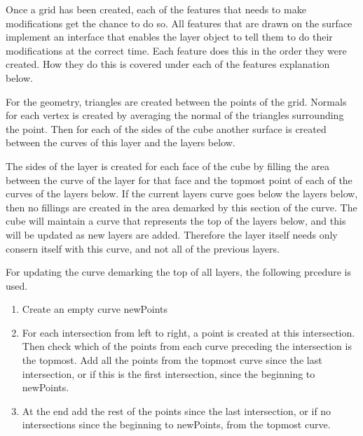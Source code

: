 \documentclass[a4paper,12pt]{article}
\begin{document}
Once a grid has been created, each of the features that needs to make modifications get the chance to do so. All features that are drawn on the surface implement an interface that enables the layer object to tell them to do their modifications at the correct time. Each feature does this in the order they were created. How they do this is covered under each of the features explanation below.

For the geometry, triangles are created between the points of the grid. Normals for each vertex is created by averaging the normal of the triangles surrounding the point. Then for each of the sides of the cube another surface is created between the curves of this layer and the layers below.

The sides of the layer is created for each face of the cube by filling the area between the curve of the layer for that face and the topmost point of each of the curves of the layers below. If the current layers curve goes below the layers below, then no fillings are created in the area demarked by this section of the curve. The cube will maintain a curve that represents the top of the layers below, and this will be updated as new layers are added. Therefore the layer itself needs only consern itself with this curve, and not all of the previous layers.

For updating the curve demarking the top of all layers, the following prcedure is used. 
\begin{enumerate}
 \item Create an empty curve newPoints
 \item For each intersection from left to right, a point is created at this intersection. Then check which of the points from each curve preceding the intersection is the topmost. Add all the points from the topmost curve since the last intersection, or if this is the first intersection, since the beginning to newPoints.
 \item At the end add the rest of the points since the last intersection, or if no intersections since the beginning to newPoints, from the topmost curve.
\end{enumerate}
\end{document}
